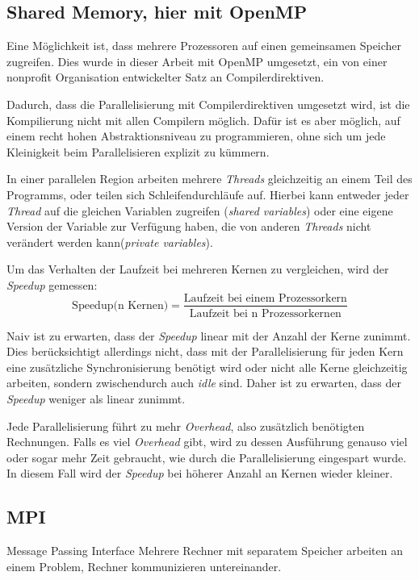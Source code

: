 	\subsection{Shared Memory, hier mit OpenMP}
	\label{subsec:openmptheorie}
	Eine Möglichkeit ist, dass mehrere Prozessoren auf einen gemeinsamen Speicher zugreifen. Dies wurde in dieser Arbeit mit OpenMP umgesetzt, ein von einer nonprofit Organisation entwickelter Satz an Compilerdirektiven\cite{specificationsopenmp}.
	
	Dadurch, dass die Parallelisierung mit Compilerdirektiven umgesetzt wird, ist die Kompilierung nicht mit allen Compilern möglich. Dafür ist es aber möglich, auf einem recht hohen Abstraktionsniveau zu programmieren, ohne sich um jede Kleinigkeit beim Parallelisieren explizit zu kümmern\cite[vgl. ][S. 209]{pachecoparallel}.	
	
	In einer parallelen Region arbeiten mehrere \textit{Threads} gleichzeitig an einem Teil des Programms, oder teilen sich Schleifendurchläufe auf. Hierbei kann entweder jeder \textit{Thread} auf die gleichen Variablen zugreifen (\textit{shared variables}) oder eine eigene Version der Variable zur Verfügung haben, die von anderen \textit{Threads} nicht verändert werden kann(\textit{private variables})\cite[vgl. ][S. 231 f.]{pachecoparallel}. 
	
	Um das Verhalten der Laufzeit bei mehreren Kernen zu vergleichen, wird der \textit{Speedup} gemessen:
	\begin{equation}
	\text{Speedup(n Kernen)}=\frac{\text{Laufzeit bei einem Prozessorkern}}{\text{Laufzeit bei n Prozessorkernen}}
	\label{eq:speedup}
	\end{equation}
	
	Naiv ist zu erwarten, dass der \textit{Speedup} linear mit der Anzahl der Kerne zunimmt. Dies berücksichtigt allerdings nicht, dass mit der Parallelisierung für jeden Kern eine zusätzliche Synchronisierung benötigt wird oder nicht alle Kerne gleichzeitig arbeiten, sondern zwischendurch auch \textit{idle} sind. Daher ist zu erwarten, dass der \textit{Speedup} weniger als linear zunimmt\cite[vgl. ][S. 58 f.]{pachecoparallel}.
	
	
	
	Jede Parallelisierung führt zu mehr \textit{Overhead}, also zusätzlich benötigten Rechnungen. Falls es viel \textit{Overhead} gibt, wird zu dessen Ausführung genauso viel oder sogar mehr Zeit gebraucht, wie durch die Parallelisierung eingespart wurde. In diesem Fall wird der \textit{Speedup} bei höherer Anzahl an Kernen wieder kleiner.
	\subsection{MPI}
	\label{subsecmpitheorie}
	Message Passing Interface
	Mehrere Rechner mit separatem Speicher arbeiten an einem Problem, Rechner kommunizieren untereinander.	